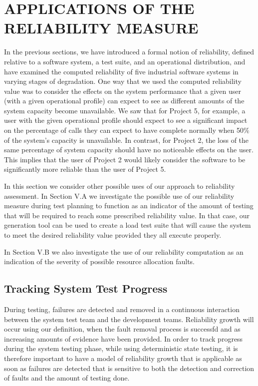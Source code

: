 \documentclass[journal, twoside]{IEEEtran}
\begin{document}
\section{APPLICATIONS OF THE RELIABILITY MEASURE}
In the previous sections, we have introduced a formal notion
of reliability, defined relative to a software system, a test suite,
and an operational distribution, and have examined the computed reliability of five industrial software systems in varying
stages of degradation. One way that we used the computed
reliability value was to consider the effects on the system performance that a given user (with a given operational profile)
can expect to see as different amounts of the system capacity
become unavailable. We saw that for Project 5, for example, a
user with the given operational profile should expect to see a
significant impact on the percentage of calls they can expect to
have complete normally when 50\% of the system’s capacity is
unavailable. In contrast, for Project 2, the loss of the same
percentage of system capacity should have no noticeable effects on the user. This implies that the user of Project 2 would
likely consider the software to be significantly more reliable
than the user of Project 5.

In this section we consider other possible uses of our approach to reliability assessment. In Section V.A we investigate
the possible use of our reliability measure during test planning
to function as an indicator of the amount of testing that will be
required to reach some prescribed reliability value. In that
case, our generation tool can be used to create a load test suite
that will cause the system to meet the desired reliability value
provided they all execute properly. 

In Section V.B we also investigate the use of our reliability
computation as an indication of the severity of possible resource allocation faults.

\subsection{Tracking System Test Progress}
During testing, failures are detected and removed in a continuous interaction between the system test team and the development teams. Reliability growth will occur using our
definition, when the fault removal process is successfd and as
increasing amounts of evidence have been provided. In order
to track progress during the system testing phase, while using
deterministic state testing, it is therefore important to have a
model of reliability growth that is applicable as soon as failures are detected that is sensitive to both the detection and
correction of faults and the amount of testing done. 
\end{document}
